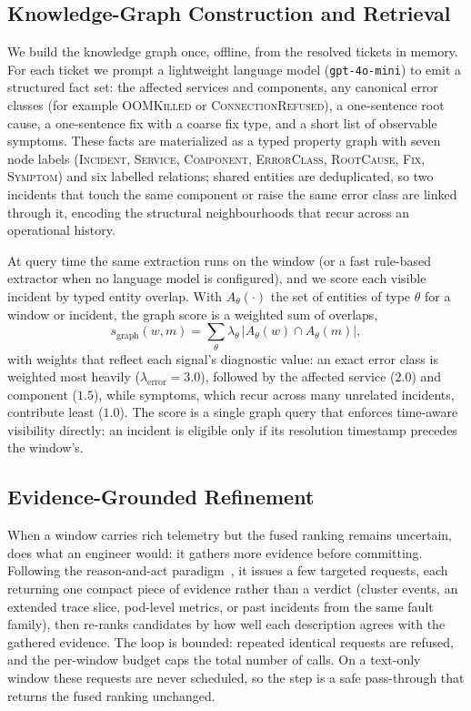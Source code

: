 \subsection{Knowledge-Graph Construction and Retrieval}
\label{sec:approach-kg}

We build the knowledge graph once, offline, from the resolved tickets in memory. For each ticket we prompt a lightweight language model
(\texttt{gpt-4o-mini}) to emit a structured fact set: the affected services and
components, any canonical error classes (for example \textsc{OOMKilled} or
\textsc{ConnectionRefused}), a one-sentence root cause, a one-sentence fix with a
coarse fix type, and a short list of observable symptoms. These facts are
materialized as a typed property graph with seven node labels (\textsc{Incident},
\textsc{Service}, \textsc{Component}, \textsc{ErrorClass}, \textsc{RootCause},
\textsc{Fix}, \textsc{Symptom}) and six labelled relations; shared entities are
deduplicated, so two incidents that touch the same component or raise the same
error class are linked through it, encoding the structural neighbourhoods that
recur across an operational history.

At query time the same extraction runs on the window (or a fast rule-based
extractor when no language model is configured), and we score each visible
incident by typed entity overlap. With $A_\theta(\cdot)$ the set of entities of
type $\theta$ for a window or incident, the graph score is a weighted sum of
overlaps,
\begin{equation}
s_{\text{graph}}(w,m)=\sum_{\theta}\lambda_\theta\,
\big|A_\theta(w)\cap A_\theta(m)\big|,
\end{equation}
with weights that reflect each signal's diagnostic value: an exact error class is
weighted most heavily ($\lambda_{\text{error}}=3.0$), followed by the affected
service ($2.0$) and component ($1.5$), while symptoms, which recur across many
unrelated incidents, contribute least ($1.0$). The score is a single graph query
that enforces time-aware visibility directly: an incident is eligible only if
its resolution timestamp precedes the window's.

\subsection{Evidence-Grounded Refinement}
\label{sec:approach-react}

When a window carries rich telemetry but the fused ranking remains uncertain,
\sys{} does what an engineer would: it gathers more evidence before committing.
Following the reason-and-act paradigm~\cite{yao2023react}, it issues a few targeted
requests, each returning one compact piece of evidence rather than a verdict
(cluster events, an extended trace slice, pod-level metrics, or past incidents from
the same fault family), then re-ranks candidates by how well each description agrees
with the gathered evidence. The loop is bounded: repeated identical requests are refused,
and the per-window budget caps the total number of calls. On a text-only window
these requests are never scheduled, so the step is a safe pass-through that returns
the fused ranking unchanged.

